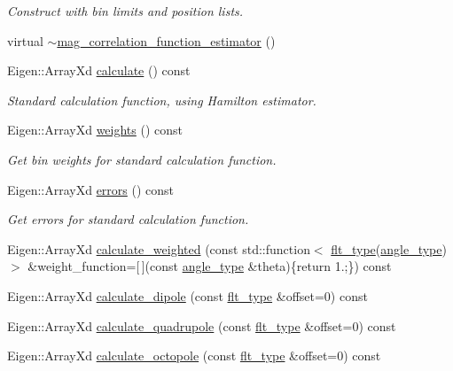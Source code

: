 \begin{DoxyCompactItemize}
\begin{DoxyCompactList}\small\item\em Construct with bin limits and position lists. \end{DoxyCompactList}\item 
virtual \hyperlink{classIceBRG_1_1mag__correlation__function__estimator_a8d3457d60040f2a4b8114bd960578602}{$\sim$mag\+\_\+correlation\+\_\+function\+\_\+estimator} ()
\item 
Eigen\+::\+Array\+Xd \hyperlink{classIceBRG_1_1mag__correlation__function__estimator_a0cad08d37e08c2ef1397e87609647f30}{calculate} () const 
\begin{DoxyCompactList}\small\item\em Standard calculation function, using Hamilton estimator. \end{DoxyCompactList}\item 
Eigen\+::\+Array\+Xd \hyperlink{classIceBRG_1_1mag__correlation__function__estimator_a75f844fbabc0b370ef6eafac119ac487}{weights} () const 
\begin{DoxyCompactList}\small\item\em Get bin weights for standard calculation function. \end{DoxyCompactList}\item 
Eigen\+::\+Array\+Xd \hyperlink{classIceBRG_1_1mag__correlation__function__estimator_a5255e1f640ca3ec3eed500290b48551e}{errors} () const 
\begin{DoxyCompactList}\small\item\em Get errors for standard calculation function. \end{DoxyCompactList}\item 
Eigen\+::\+Array\+Xd \hyperlink{classIceBRG_1_1mag__correlation__function__estimator_af2088b0c2fe2d5c6c33d25419fd0fab3}{calculate\+\_\+weighted} (const std\+::function$<$ \hyperlink{lib_2IceBRG__main_2common_8h_ad0f130a56eeb944d9ef2692ee881ecc4}{flt\+\_\+type}(\hyperlink{namespaceIceBRG_a688eeb0811a2474b20b667ed2e9625a1}{angle\+\_\+type})$>$ \&weight\+\_\+function=\mbox{[}$\,$\mbox{]}(const \hyperlink{namespaceIceBRG_a688eeb0811a2474b20b667ed2e9625a1}{angle\+\_\+type} \&theta)\{return 1.;\}) const 
\item 
Eigen\+::\+Array\+Xd \hyperlink{classIceBRG_1_1mag__correlation__function__estimator_a4c851a8f4cee148e4334c810c5e418be}{calculate\+\_\+dipole} (const \hyperlink{lib_2IceBRG__main_2common_8h_ad0f130a56eeb944d9ef2692ee881ecc4}{flt\+\_\+type} \&offset=0) const 
\item 
Eigen\+::\+Array\+Xd \hyperlink{classIceBRG_1_1mag__correlation__function__estimator_aaffcdd4f844aa6f5ec507a413d7cdf0c}{calculate\+\_\+quadrupole} (const \hyperlink{lib_2IceBRG__main_2common_8h_ad0f130a56eeb944d9ef2692ee881ecc4}{flt\+\_\+type} \&offset=0) const 
\item 
Eigen\+::\+Array\+Xd \hyperlink{classIceBRG_1_1mag__correlation__function__estimator_a3ccc3e13d9e80433a0f5a476f57aa5b4}{calculate\+\_\+octopole} (const \hyperlink{lib_2IceBRG__main_2common_8h_ad0f130a56eeb944d9ef2692ee881ecc4}{flt\+\_\+type} \&offset=0) const 
\end{DoxyCompactItemize}


